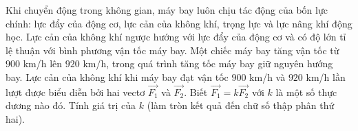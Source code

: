 \begin{bt}%
	Khi chuyển động trong không gian, máy bay luôn chịu tác động của bốn lực chính: lực đẩy của động cơ, lực cản của không khí, trọng lực và lực nâng khí động học. Lực cản của không khí ngược hướng với lực đẩy của động cơ và có độ lớn tỉ lệ thuận với bình phương vận tốc máy bay. Một chiếc máy bay tăng vận tốc từ $900$ km/h lên $920$ km/h, trong quá trình tăng tốc máy bay giữ nguyên hướng bay. Lực cản của không khí khi máy bay đạt vận tốc $900$ km/h và $920$ km/h lần lượt được biểu diễn bởi hai vectơ $\overrightarrow{F_1}$ và $\overrightarrow{F_2}$. Biết $\overrightarrow{F_1}=k \overrightarrow{F_2}$ với $k$ là một số thực dương nào đó. Tính giá trị của $k$ (làm tròn kết quả đến chữ số thập phân thứ hai).
	\begin{center}
\end{center}
\end{bt}
